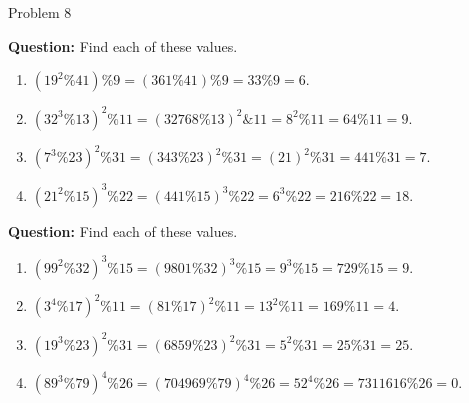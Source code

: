 \begin{problem}{Problem 8}
    \begin{highlight}[Solution - \#32]
        \noindent \textbf{Question:} Find each of these values.

        \begin{enumerate}[label=(\alph*)]
            \item $(19^{2} \% 41) \% 9 = (361 \% 41) \% 9 = 33 \% 9 = 6.$
            \item $(32^{3} \% 13)^{2} \% 11 = (32768 \% 13)^{2} \& 11 = 8^{2} \% 11 = 64 \% 11 = 9.$
            \item $(7^{3} \% 23)^{2} \% 31 = (343 \% 23)^{2} \% 31 = (21)^{2} \% 31 = 441 \% 31 = 7.$
            \item $(21^{2} \% 15)^{3} \% 22 = (441 \% 15)^{3} \% 22 = 6^{3} \% 22 = 216 \% 22 = 18.$
        \end{enumerate}
    \end{highlight}

    \begin{highlight}[Solution - \#33]
        \noindent \textbf{Question:} Find each of these values.

        \begin{enumerate}[label=(\alph*)]
            \item $(99^{2} \% 32)^{3} \% 15 = (9801 \% 32)^{3} \% 15 = 9^{3} \% 15 = 729 \% 15 = 9.$
            \item $(3^{4} \% 17)^{2} \% 11 = (81 \% 17)^{2} \% 11 = 13^{2} \% 11 = 169 \% 11 = 4.$
            \item $(19^{3} \% 23)^{2} \% 31 = (6859 \% 23)^{2} \% 31 = 5^{2} \% 31 = 25 \% 31 = 25.$
            \item $(89^{3} \% 79)^{4} \% 26 = (704969 \% 79)^{4} \% 26 = 52^{4} \% 26 = 7311616 \% 26 = 0.$
        \end{enumerate}
    \end{highlight}
\end{problem}

